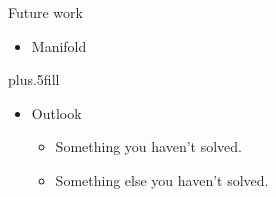 \documentclass[pdftex]{beamer}
\begin{document}
\begin{frame}{Future work}

  \begin{itemize}
  \item Manifold
  \end{itemize}

  \vskip0pt plus.5fill
  \begin{itemize}
  \item Outlook
    \begin{itemize}
    \item Something you haven't solved.
    \item Something else you haven't solved.
    \end{itemize}
  \end{itemize}
\end{frame}
\end{document}
